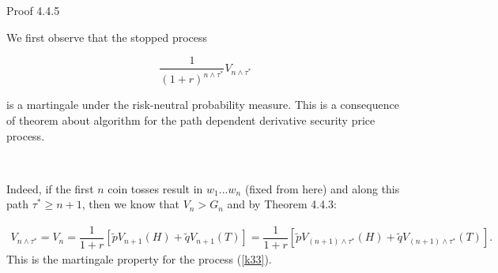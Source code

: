 \documentclass[c, dvipsnames, 8pt]{beamer}
\begin{document}
\begin{frame}[shrink=5]
\frametitle{\insertsection} 
\framesubtitle{\insertsubsection} 


\begin{block}{Proof 4.4.5}
\end{block}

 We first observe that the stopped process

\begin{equation}\label{k33}
\dfrac{1}{(1+r)^{n \wedge \tau^*} } V_{n \wedge \tau^*}
\end{equation}

is a martingale under the risk-neutral probability measure. This is a consequence of theorem about algorithm for the path dependent derivative security price process.  

\


Indeed, if the first $n$ coin tosses result in $w_1...w_n$ (fixed from here) and
along this path $\tau^* \geq n + 1$, then we know that $V_n > G_n$  and by  Theorem 4.4.3:

\begin{multline}
V_{n \wedge \tau^*} = V_n = \dfrac{1}{1+r} [\tilde{p}V_{n+1}(H)  + \tilde{q}V_{n+1}(T) ] = \dfrac{1}{1+r} [\tilde{p}V_{(n+1) \wedge \tau^*}(H)  + \tilde{q}V_{(n+1) \wedge \tau^*}(T) ].
\end{multline}
This is the martingale property for the process (\ref{k33}). 

\end{frame}	
\end{document}
